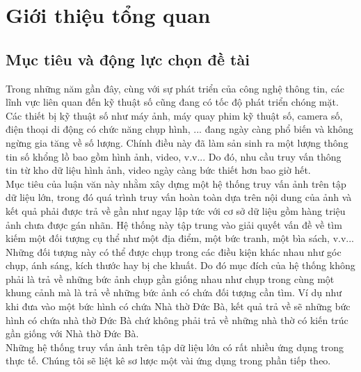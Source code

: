 
\chapter{Giới thiệu tổng quan}
\ifpdf
    \graphicspath{{Chapter1/Chapter1Figs/PNG/}{Chapter1/Chapter1Figs/PDF/}{Chapter1/Chapter1Figs/}}
\else
    \graphicspath{{Chapter1/Chapter1Figs/EPS/}{Chapter1/Chapter1Figs/}}
\fi

\section{Mục tiêu và động lực chọn đề tài}
Trong những năm gần đây, cùng với sự phát triển của công nghệ thông tin, các lĩnh vực liên quan đến kỹ thuật số cũng đang có tốc độ phát triển chóng mặt. Các thiết bị kỹ thuật số như máy ảnh, máy quay phim kỹ thuật số, camera số, điện thoại di động có chức năng chụp hình, ... đang ngày càng phổ biến và không ngừng gia tăng về số lượng. Chính điều này đã làm sản sinh ra một lượng thông tin số khổng lồ bao gồm hình ảnh, video, v.v... Do đó, nhu cầu truy vấn thông tin từ kho dữ liệu hình ảnh, video ngày càng bức thiết hơn bao giờ hết.\\
Mục tiêu của luận văn này nhằm xây dựng một hệ thống truy vấn ảnh trên tập dữ liệu lớn, trong đó quá trình truy vấn hoàn toàn dựa trên nội dung của ảnh và kết quả phải được trả về gần như ngay lập tức với cơ sở dữ liệu gồm hàng triệu ảnh chưa được gán nhãn. Hệ thống này tập trung vào giải quyết vấn đề về tìm kiếm một đối tượng cụ thể như một địa điểm, một bức tranh, một bìa sách, v.v... Những đối tượng này có thể được chụp trong các điều kiện khác nhau như góc chụp, ánh sáng, kích thước hay bị che khuất. Do đó mục đích của hệ thống không phải là trả về những bức ảnh chụp gần giống nhau như chụp trong cùng một khung cảnh mà là trả về những bức ảnh có chứa đối tượng cần tìm. Ví dụ như khi đưa vào một bức hình có chứa Nhà thờ Đức Bà, kết quả trả về sẽ những bức hình có chứa nhà thờ Đức Bà chứ không phải trả về những nhà thờ có kiến trúc gần giống với Nhà thờ Đức Bà.\\
Những hệ thống truy vấn ảnh trên tập dữ liệu lớn có rất nhiều ứng dụng trong thực tế. Chúng tôi sẽ liệt kê sơ lược một vài ứng dụng trong phần tiếp theo.\\

